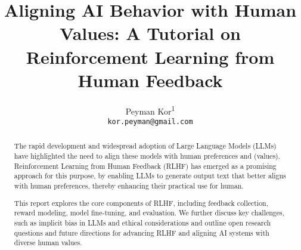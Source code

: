 \documentclass[11pt]{article}
\title{Aligning AI Behavior with Human Values: A Tutorial on Reinforcement Learning from Human Feedback}
\author{
    Peyman Kor\textsuperscript{1} \\ \texttt{kor.peyman@gmail.com}
}
\affil[1]{Energy Resources Department, University of Stavanger, Norway}
\date{}  %
\begin{document}
\maketitle
\onehalfspacing  %
\begin{abstract}

The rapid development and widespread adoption of Large Language Models (LLMs) have highlighted the 
need to align these models with human preferences and (values). Reinforcement Learning from 
Human Feedback (RLHF) has emerged as a promising approach for this purpose, by enabling 
LLMs to generate output text that better aligns with human preferences, thereby enhancing their practical use for human.

This report explores the core components of RLHF, including feedback collection, reward modeling, model fine-tuning, and evaluation.
We further discuss key challenges, such as implicit bias in LLMs and ethical considerations 
and outline open research questions and future directions for advancing RLHF and aligning AI systems 
with diverse human values.
\end{abstract}

\tableofcontents
\newpage












%
%

\end{document}
